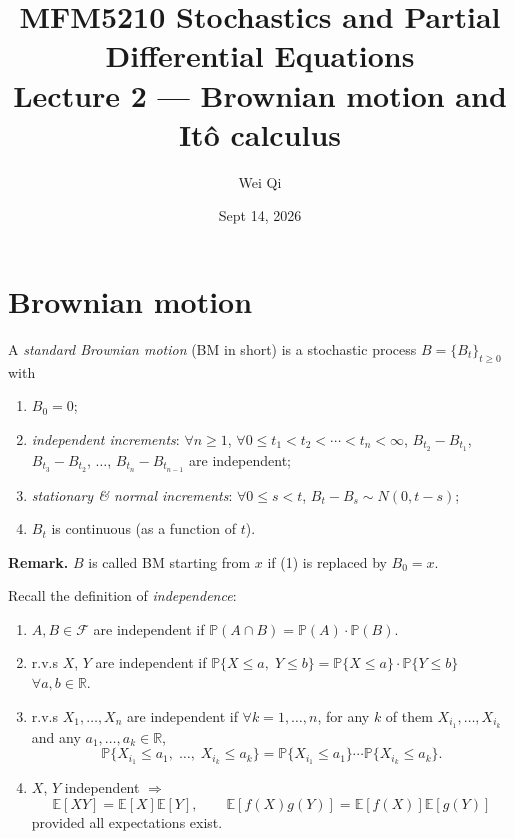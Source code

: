 \documentclass[11pt]{article}
\title{\textbf{MFM5210 Stochastics and Partial Differential Equations}\\[4pt]
\large Lecture 2 --- Brownian motion and It\^o calculus}
\author{Wei Qi}
\date{Sept 14, 2026}
\newcommand{\Prob}{\mathbb{P}}
\newcommand{\E}{\mathbb{E}}
\newcommand{\R}{\mathbb{R}}
\newcommand{\F}{\mathcal{F}}
\theoremstyle{definition}
\begin{document}
\maketitle

\section{Brownian motion}

A \emph{standard Brownian motion} (BM in short) is a stochastic process
$B=\{B_t\}_{t\ge0}$ with

\begin{enumerate}
\item $B_0=0$;
\item \emph{independent increments}: $\forall n\ge1$, $\forall 0\le t_1<t_2<\cdots<t_n<\infty$,
      $B_{t_2}-B_{t_1}$, $B_{t_3}-B_{t_2}$, $\ldots$, $B_{t_n}-B_{t_{n-1}}$ are independent;
\item \emph{stationary \& normal increments}: $\forall 0\le s<t$, $B_t-B_s\sim N(0,t-s)$;
\item $B_t$ is continuous (as a function of $t$).
\end{enumerate}

\begin{center}
\end{center}

\noindent\textbf{Remark.} $B$ is called BM starting from $x$ if (1) is replaced by $B_0=x$.

\medskip
\noindent Recall the definition of \emph{independence}:

\begin{enumerate}
\item[(i)] $A,B\in\F$ are independent if $\Prob(A\cap B)=\Prob(A)\cdot\Prob(B)$.
\item[(ii)] r.v.s $X$, $Y$ are independent if
      $\Prob\{X\le a,\;Y\le b\}=\Prob\{X\le a\}\cdot\Prob\{Y\le b\}$
      $\forall a,b\in\R$.
\item[(iii)] r.v.s $X_1,\ldots,X_n$ are independent if $\forall k=1,\ldots,n$, for any $k$ of them
      $X_{i_1},\ldots,X_{i_k}$ and any $a_1,\ldots,a_k\in\R$,
      \[
        \Prob\{X_{i_1}\le a_1,\;\ldots,\;X_{i_k}\le a_k\}
        =\Prob\{X_{i_1}\le a_1\}\cdots\Prob\{X_{i_k}\le a_k\}.
      \]
\item[(iv)] $X$, $Y$ independent $\Rightarrow$
      \[
        \E[XY]=\E[X]\E[Y],\qquad \E[f(X)g(Y)]=\E[f(X)]\E[g(Y)]
      \]
      provided all expectations exist.
\end{enumerate}
\end{document}
